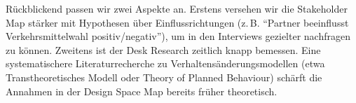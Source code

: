 Rückblickend passen wir zwei Aspekte an.
Erstens versehen wir die Stakeholder Map stärker mit Hypothesen über Einflussrichtungen (z.\,B. ``Partner beeinflusst Verkehrsmittelwahl positiv/negativ''), um in den Interviews gezielter nachfragen zu können.
Zweitens ist der Desk Research zeitlich knapp bemessen.
Eine systematischere Literaturrecherche zu Verhaltensänderungsmodellen (etwa Transtheoretisches Modell oder Theory of Planned Behaviour) schärft die Annahmen in der Design Space Map bereits früher theoretisch.

